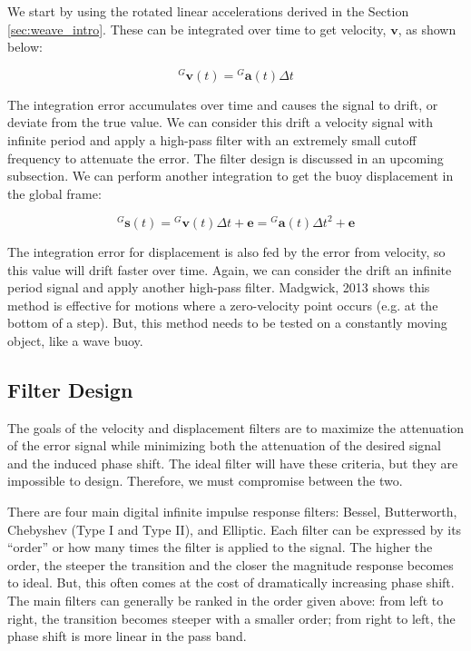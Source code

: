 We start by using the rotated linear accelerations derived in the Section \ref{sec:weave_intro}. 
These can be integrated over time to get velocity, $\pmb{v}$, as shown below:

\begin{equation}
    {}^G\pmb{v}(t) = {}^G\pmb{a}(t) \Delta t
\end{equation}

The integration error accumulates over time and causes the signal to drift, or deviate from the true value. 
We can consider this drift a velocity signal with infinite period and apply a high-pass filter with an extremely small cutoff frequency to attenuate the error. 
The filter design is discussed in an upcoming subsection. 
We can perform another integration to get the buoy displacement in the global frame:

\begin{equation}
    {}^G\pmb{s}(t) = {}^G\pmb{v}(t)\Delta t + \pmb{e} = {}^G\pmb{a}(t) \Delta t^2 + \pmb{e}
\end{equation}

The integration error for displacement is also fed by the error from velocity, so this value will drift faster over time. 
Again, we can consider the drift an infinite period signal and apply another high-pass filter. 
Madgwick, 2013 shows this method is effective for motions where a zero-velocity point occurs (e.g. at the bottom of a step). 
But, this method needs to be tested on a constantly moving object, like a wave buoy.

\subsection{Filter Design}
The goals of the velocity and displacement filters are to maximize the attenuation of the error signal while minimizing both the attenuation of the desired signal and the induced phase shift. 
The ideal filter will have these criteria, but they are impossible to design. 
Therefore, we must compromise between the two.

There are four main digital infinite impulse response filters: Bessel, Butterworth, Chebyshev (Type I and Type II), and Elliptic. 
Each filter can be expressed by its ``order'' or how many times the filter is applied to the signal. 
The higher the order, the steeper the transition and the closer the magnitude response becomes to ideal. 
But, this often comes at the cost of dramatically increasing phase shift. 
The main filters can generally be ranked in the order given above: from left to right, the transition becomes steeper with a smaller order; from right to left, the phase shift is more linear in the pass band.

